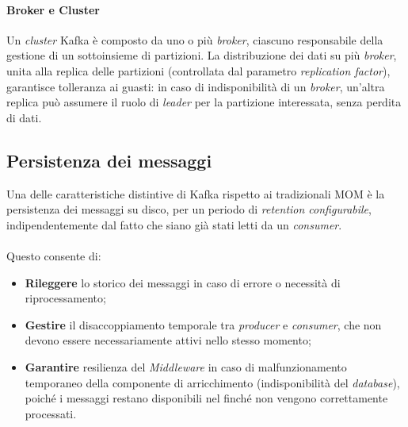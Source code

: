 \paragraph{Broker e Cluster} Un \textit{cluster} Kafka è composto da uno o più \textit{broker}, ciascuno responsabile della gestione di un sottoinsieme di partizioni. La distribuzione dei dati su più \textit{broker}, unita alla replica delle partizioni (controllata dal parametro \textit{replication factor}), garantisce tolleranza ai guasti: in caso di indisponibilità di un \textit{broker}, un'altra replica può assumere il ruolo di \textit{leader} per la partizione interessata, senza perdita di dati.

\subsection{Persistenza dei messaggi}
Una delle caratteristiche distintive di Kafka rispetto ai tradizionali \acrshort{MOM} è la persistenza dei messaggi su disco, per un periodo di \textit{retention configurabile}, indipendentemente dal fatto che siano già stati letti da un \textit{consumer}. \\ \\
Questo consente di:
\begin{itemize}
    \item \textbf{Rileggere} lo storico dei messaggi in caso di errore o necessità di riprocessamento;
    \item \textbf{Gestire} il disaccoppiamento temporale tra \textit{producer} e \textit{consumer}, che non devono essere necessariamente attivi nello stesso momento;
    \item \textbf{Garantire} resilienza del \textit{Middleware} in caso di malfunzionamento temporaneo della componente di arricchimento (indisponibilità del \textit{database}), poiché i messaggi restano disponibili nel \textit{} finché non vengono correttamente processati.
\end{itemize}
\newpage
